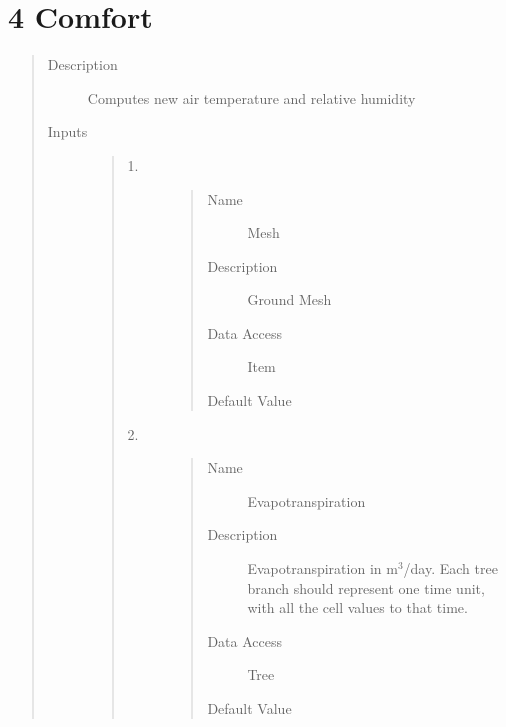 \documentclass[letterpaper,10pt,english]{sphinxmanual}
\begin{document}
\section{4 \textbar{} Comfort}
\label{\detokenize{components:comfort}}
\begin{quote}\begin{description}
\item[{Description}] \leavevmode
Computes new air temperature and relative humidity

\item[{Inputs}] \leavevmode\begin{quote}\begin{description}
\item[{1.}] \leavevmode\begin{quote}\begin{description}
\item[{Name}] \leavevmode
Mesh

\item[{Description}] \leavevmode
Ground Mesh

\item[{Data Access}] \leavevmode
Item

\item[{Default Value}] \leavevmode
{}

\end{description}\end{quote}

\item[{2.}] \leavevmode\begin{quote}\begin{description}
\item[{Name}] \leavevmode
Evapotranspiration

\item[{Description}] \leavevmode
Evapotranspiration in m$^{\text{3}}$/day.
Each tree branch should represent one time unit, with all the cell values to that time.

\item[{Data Access}] \leavevmode
Tree

\item[{Default Value}] \leavevmode
{}


\end{description}
\end{quote}
\end{description}
\end{quote}
\end{description}
\end{quote}
\end{document}

